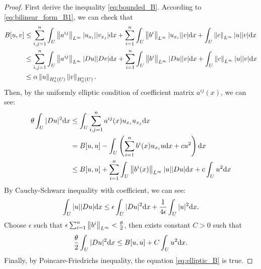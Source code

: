 \begin{proof}
    First derive the inequality \eqref{eq:bounded_B}. According to \eqref{eq:bilinear_form_B1}, we can check that 
    \begin{equation}
        \label{eq:derive_energy_B}
        \begin{aligned}
            B[u,v]&\le\sum_{i,j=1}^{n}\int_{U}\left\|a^{ij}\right\|_{L^{\infty}}|u_{x_{i}}||v_{x_{j}}|\mathrm{d} x+\sum_{i=1}^{n}\int_{U}\left\|b^{i}\right\|_{L^{\infty}}|u_{x_{i}}||v|\mathrm{d} x+\int_{U}\left\|c\right\|_{L^{\infty}}|u||v|\mathrm{d} x\\
            &\le\sum_{i,j=1}^{n}\int_{U}\left\|a^{ij}\right\|_{L^{\infty}}|Du||Dv|\mathrm{d} x+\sum_{i=1}^{n}\int_{U}\left\|b^{i}\right\|_{L^{\infty}}|Du||v|\mathrm{d} x+\int_{U}\left\|c\right\|_{L^{\infty}}|u||v|\mathrm{d} x\\
            &\le\alpha\left\|u\right\|_{H_{0}^{1}(U)}\left\|v\right\|_{H_{0}^{1}(U)}.
        \end{aligned}
    \end{equation}
    Then, by the uniformly elliptic condition of coefficient matrix $a^{ij}(x)$, we can see:
    \begin{equation}
        \label{eq:elliptic_for_a}
        \begin{aligned}
        \theta\int_{U}|Du|^{2}\mathrm{d} x&\le \int_{U}\sum_{i,j=1}^{n}a^{ij}(x)u_{x_{i}}u_{x_{j}}\mathrm{d} x\\
        &=B[u,u]-\int_{U}\left(\sum_{i=1}^{n}b^{i}(x)u_{x_{i}}u\mathrm{d} x+cu^{2}\right)\mathrm{d} x\\
        &\le B[u,u]+\sum_{i=1}^{n}\int_{U}\left\|b^{i}(x)\right\|_{L^{\infty}}|u||Du|\mathrm{d} x+c\int_{U}u^{2}\mathrm{d} x\\ 
        \end{aligned}
    \end{equation}
    By Cauchy-Schwarz inequality with coefficient, we can see:
    \begin{equation}
        \label{eq:cauchy_schwarz}
        \int_{U}|u||Du|\mathrm{d} x\le\epsilon\int_{U}|Du|^{2}\mathrm{d} x+\frac{1}{4\epsilon}\int_{U}|u|^{2}\mathrm{d} x.
    \end{equation}
    Choose $\epsilon$ such that $\epsilon\sum_{i=1}^{n}\left\|b^{i}\right\|_{L^{\infty}}<\frac{\theta}{2}$, then exists constant $C>0$ such that 
    \begin{equation}
        \label{eq:inequality_for_ellip}
        \frac{\theta}{2}\int_{U}|Du|^{2}\mathrm{d} x\le B[u,u]+C\int_{U}u^{2}\mathrm{d} x.
    \end{equation}
    Finally, by Poincare-Friedrichs inequality, the equation \eqref{eq:elliptic_B} is true.
\end{proof}
